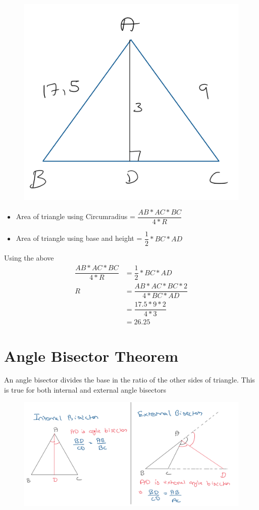 
\begin{figure}[h!]
    \centering
    \includegraphics[width=0.4\linewidth]{Quant//Geometry//Images//Triangles/geo_center_question_2.png}
\end{figure}

\begin{itemize}
    \item Area of triangle using Circumradius = $\dfrac{AB * AC * BC}{4 * R}$
    \item Area of triangle using base and height = $\dfrac{1}{2} * BC *  AD$
\end{itemize}

Using the above 
\begin{align*}
    \dfrac{AB * AC * BC}{4 * R} &= \dfrac{1}{2} * BC *  AD \\
    R &= \dfrac{AB * AC * BC * 2}{4 * BC * AD} \\
    &= \dfrac{17.5 * 9 * 2}{4 * 3} \tag{Removed BC as it is common} \\
    &= 26.25
\end{align*}







\newpage
\section{Angle Bisector Theorem}
An angle bisector divides the base in the ratio of the other sides of triangle. This is true for both internal and external angle bisectors

\begin{figure}[h!]
    \centering
    \includegraphics[width=1.02\linewidth]{Quant//Geometry//Images//Triangles/angle_bisector_theorem.png}
\end{figure}

